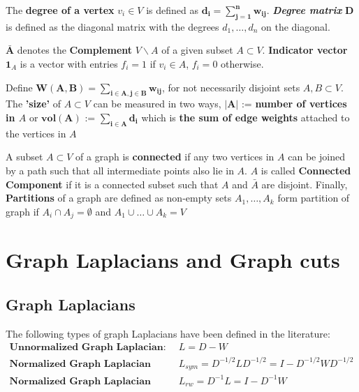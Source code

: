 \documentclass[10pt,a4paper, nocenter]{report}
\begin{document}
        The \textbf{degree of a vertex} $v_{i}\in V$ is defined as $ \mathbf{d_{i} = \sum_{j=1}^{n}w_{ij}}$. \textbf{\textit{Degree matrix}} $\mathbf{D}$ is defined as the diagonal matrix with the degrees $d_{1} ,\dots, d_{n}$ on the diagonal. 

        $\mathbf{\bar{A}}$ denotes the \textbf{Complement} $V \backslash A$  of a given subset $A \subset V$. \textbf{Indicator vector} $\mathbf{1}_{A}$ is a vector with entries $f_{i} = 1$ if $v_{i} \in A$, $f_{i}=0$ otherwise.

        Define $\mathbf{W(A,B) = \sum_{i\in A, j\in B}w_{ij}}$, for not necessarily disjoint sets $A, B \subset V$.
        The \textbf{'size'} of $A \subset V$ can be measured in two ways, $\mathbf{\lvert A \rvert}$ := \textbf{number of vertices in $A$} or $\mathbf{vol(A)}$ := $\mathbf{\sum_{i\in A}d_{i}}$ which is \textbf{the sum of edge weights} attached to the vertices in $A$

        A subset $A \subset V$ of a graph is \textbf{connected} if any two vertices in $A$ can be joined by a path such that all intermediate points also lie in $A$. $A$ is called \textbf{Connected Component} if it is a connected subset such that $A$ and $\bar{A}$ are disjoint. Finally, \textbf{Partitions} of a graph are defined as non-empty sets $A_{1},\dots,A_{k}$ form partition of graph if $A_{i} \cap A_{j} = \emptyset$ and $A_{1}\cup \dots \cup A_{k} = V$

    \section{Graph Laplacians and Graph cuts}
    \subsection{Graph Laplacians}
        The following types of graph Laplacians have been defined in the literature:
        \begin{align*}
         \textbf{Unnormalized Graph Laplacian: } &L = D- W \\
         \textbf{Normalized Graph Laplacian (Symmetric): } &L_{sym} = D^{-1/2}LD^{-1/2} = I - D^{-1/2}WD^{-1/2} \\
         \textbf{Normalized Graph Laplacian (Random walk): } &L_{rw} = D^{-1}L = I - D^{-1}W 
        \end{align*}
\end{document}
